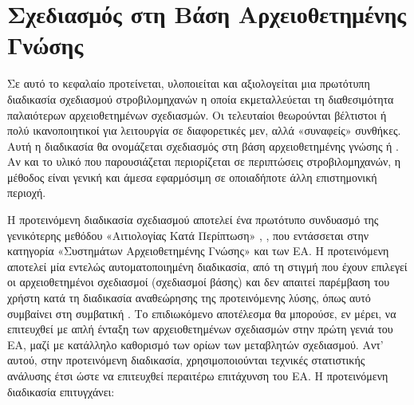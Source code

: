 \chapter{Σχεδιασμός στη Βάση Αρχειοθετημένης Γνώσης} %

\ifpdf
    \graphicspath{{3/figures/PNG/}{3/figures/PDF/}{2.5/figures/}}
\else
    \graphicspath{{3/figures/EPS/}{3/figures/}}
\fi

Σε αυτό το κεφαλαίο προτείνεται, υλοποιείται και αξιολογείται μια πρωτότυπη διαδικασία σχεδιασμού στροβιλομηχανών η οποία εκμεταλλεύεται τη διαθεσιμότητα  παλαιότερων αρχειοθετημένων σχεδιασμών. Οι τελευταίοι θεωρούνται βέλτιστοι ή πολύ ικανοποιητικοί για λειτουργία σε διαφορετικές μεν, αλλά «συναφείς» συνθήκες. Αυτή η διαδικασία θα ονομάζεται σχεδιασμός στη βάση αρχειοθετημένης γνώσης ή  \cite{Kyriacou2010}. Αν και  το υλικό που παρουσιάζεται περιορίζεται σε περιπτώσεις στροβιλομηχανών, η μέθοδος είναι γενική και άμεσα εφαρμόσιμη σε οποιαδήποτε άλλη επιστημονική περιοχή.    

Η προτεινόμενη διαδικασία σχεδιασμού αποτελεί ένα πρωτότυπο συνδυασμό της γενικότερης μεθόδου «Αιτιολογίας Κατά Περίπτωση» , \cite{kolodner_1991,slade_1991,riesbeck_1989}, που εντάσσεται στην κατηγορία «Συστημάτων Αρχειοθετημένης Γνώσης»  και των ΕΑ. Η προτεινόμενη  αποτελεί μία εντελώς αυτοματοποιημένη διαδικασία, από τη στιγμή που έχουν επιλεγεί οι αρχειοθετημένοι σχεδιασμοί (σχεδιασμοί βάσης) και δεν απαιτεί παρέμβαση του χρήστη κατά τη διαδικασία αναθεώρησης της προτεινόμενης λύσης, όπως αυτό συμβαίνει στη συμβατική . 
Το επιδιωκόμενο αποτέλεσμα θα μπορούσε, εν μέρει, να επιτευχθεί με απλή ένταξη των αρχειοθετημένων σχεδιασμών στην πρώτη γενιά του ΕΑ, μαζί με κατάλληλο καθορισμό των ορίων των μεταβλητών σχεδιασμού. Αντ' \newline αυτού, στην προτεινόμενη διαδικασία, χρησιμοποιούνται τεχνικές στατιστικής ανάλυσης έτσι ώστε να επιτευχθεί περαιτέρω επιτάχυνση του ΕΑ. Η προτεινόμενη διαδικασία  επιτυγχάνει:           

